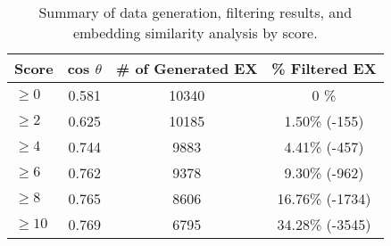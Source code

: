 
\begin{table}[h]
    \centering
    \small
    \begin{tabular}{lccc}
        \toprule
        Score & cos $\theta$ &\# of Generated EX & \%  Filtered EX \\
        \midrule
        \textbf{$\geq 0$} &0.581& 10340 & 0 \% \\ 
        \textbf{$\geq 2$} &0.625& 10185  & 1.50\% (-155) \\
        \textbf{$\geq 4$} &0.744& 9883 & 4.41\% (-457)  \\
        \textbf{$\geq 6$} &0.762 & 9378 & 9.30\% (-962)  \\
        \textbf{$\geq 8$}&0.765& 8606 & 16.76\% (-1734)\\
        \textbf{$\geq 10$} &0.769& 6795 & 34.28\% (-3545)  \\
        \bottomrule
    \end{tabular}
\caption{Summary of data generation, filtering results, and embedding similarity analysis by score.}
    \label{tab:number_of_generated}
\end{table}

